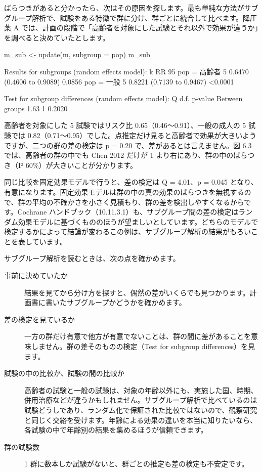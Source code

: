 ばらつきがあると分かったら、次はその原因を探します。最も単純な方法がサブグループ解析で、試験をある特徴で群に分け、群ごとに統合して比べます。降圧薬 A では、計画の段階で「高齢者を対象にした試験とそれ以外で効果が違うか」を調べると決めていたとします。

\begin{rcode}
m_sub <- update(m, subgroup = pop)
m_sub
\end{rcode}

\begin{rout}
Results for subgroups (random effects model):
              k     RR           95%
pop = 高齢者  5 0.6470 (0.4606 to 0.9089) 0.0856
pop = 一般    5 0.8221 (0.7139 to 0.9467) <0.0001

Test for subgroup differences (random effects model):
                  Q d.f. p-value
Between groups 1.63    1  0.2020
\end{rout}

高齢者を対象にした 5 試験ではリスク比 0.65（0.46〜0.91）、一般の成人の 5 試験では 0.82（0.71〜0.95）でした。点推定だけ見ると高齢者で効果が大きいようですが、二つの群の差の検定は p = 0.20 で、差があるとは言えません。図 6.3 では、高齢者の群の中でも Chen 2012 だけが 1 より右にあり、群の中のばらつき（I² 60\%）が大きいことが分かります。


\begin{hattenbox}
同じ比較を固定効果モデルで行うと、差の検定は Q = 4.01、p = 0.045 となり、有意になります。固定効果モデルは群の中の真の効果のばらつきを無視するので、群の平均の不確かさを小さく見積もり、群の差を検出しやすくなるからです。Cochrane ハンドブック（10.11.3.1）も、サブグループ間の差の検定はランダム効果モデルに基づくもののほうが望ましいとしています。どちらのモデルで検定するかによって結論が変わるこの例は、サブグループ解析の結果がもろいことを表しています。
\end{hattenbox}

サブグループ解析を読むときは、次の点を確かめます。

\begin{description}
\item[事前に決めていたか] 結果を見てから分け方を探すと、偶然の差がいくらでも見つかります。計画書に書いたサブグループかどうかを確かめます。
\item[差の検定を見ているか] 一方の群だけ有意で他方が有意でないことは、群の間に差があることを意味しません。群の差そのものの検定（Test for subgroup differences）を見ます。
\item[試験の中の比較か、試験の間の比較か] 高齢者の試験と一般の試験は、対象の年齢以外にも、実施した国、時期、併用治療などが違うかもしれません。サブグループ解析で比べているのは試験どうしであり、ランダム化で保証された比較ではないので、観察研究と同じく交絡を受けます。年齢による効果の違いを本当に知りたいなら、各試験の中で年齢別の結果を集めるほうが信頼できます。
\item[群の試験数] 1 群に数本しか試験がないと、群ごとの推定も差の検定も不安定です。
\end{description}


